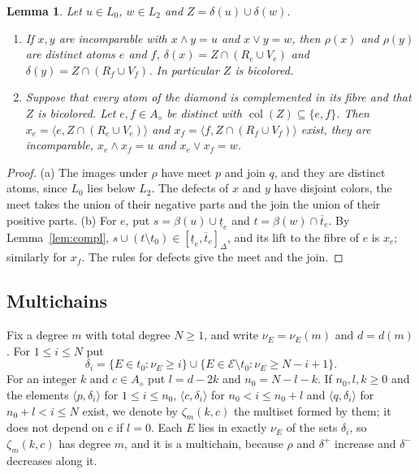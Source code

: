 \documentclass{amsart}
\newtheorem{lemma}[theorem]{Lemma}
\theoremstyle{definition}
\DeclareMathOperator{\col}{col}
\newcommand{\cE}{\mathcal E}
\newcommand{\dm}{\diamond}
\newcommand{\lt}{\underline{t}}
\newcommand{\ut}{\overline{t}}
\begin{document}
\begin{lemma}\label{lem:split}
Let $u\in L_0$, $w\in L_2$ and $Z=\delta(u)\cup\delta(w)$.
\begin{enumerate}
\item[(a)] If $x,y$ are incomparable with $x\wedge y=u$ and $x\vee y=w$, then $\rho(x)$ and $\rho(y)$ are distinct atoms $e$ and $f$, $\delta(x)=Z\cap(R_e\cup V_e)$ and $\delta(y)=Z\cap(R_f\cup V_f)$. In particular $Z$ is bicolored.
\item[(b)] Suppose that every atom of the diamond is complemented in its fibre and that $Z$ is bicolored. Let $e,f\in A_\dm$ be distinct with $\col(Z)\subseteq\{e,f\}$. Then $x_e=\langle e,Z\cap(R_e\cup V_e)\rangle$ and $x_f=\langle f,Z\cap(R_f\cup V_f)\rangle$ exist, they are incomparable, $x_e\wedge x_f=u$ and $x_e\vee x_f=w$.
\end{enumerate}
\end{lemma}

\begin{proof}
(a) The images under $\rho$ have meet $p$ and join $q$, and they are distinct atoms, since $L_0$ lies below $L_2$. The defects of $x$ and $y$ have disjoint colors, the meet takes the union of their negative parts and the join the union of their positive parts. (b) For $e$, put $s=\beta(u)\cup\lt_e$ and $t=\beta(w)\cap\ut_e$. By Lemma~\ref{lem:compl}, $s\cup(t\setminus t_0)\in[\lt_e,\ut_e]_\Delta$, and its lift to the fibre of $e$ is $x_e$; similarly for $x_f$. The rules for defects give the meet and the join.
\end{proof}

\subsection{Multichains}
Fix a degree $m$ with total degree $N\ge1$, and write $\nu_E=\nu_E(m)$ and $d=d(m)$. For $1\le i\le N$ put
\[
\delta_i=\{E\in t_0 : \nu_E\ge i\}\cup\{E\in\cE\setminus t_0 : \nu_E\ge N-i+1\}.
\]
For an integer $k$ and $c\in A_\dm$ put $l=d-2k$ and $n_0=N-l-k$. If $n_0,l,k\ge0$ and the elements $\langle p,\delta_i\rangle$ for $1\le i\le n_0$, $\langle c,\delta_i\rangle$ for $n_0<i\le n_0+l$ and $\langle q,\delta_i\rangle$ for $n_0+l<i\le N$ exist, we denote by $\zeta_m(k,c)$ the multiset formed by them; it does not depend on $c$ if $l=0$. Each $E$ lies in exactly $\nu_E$ of the sets $\delta_i$, so $\zeta_m(k,c)$ has degree $m$, and it is a multichain, because $\rho$ and $\delta^+$ increase and $\delta^-$ decreases along it.
\end{document}
